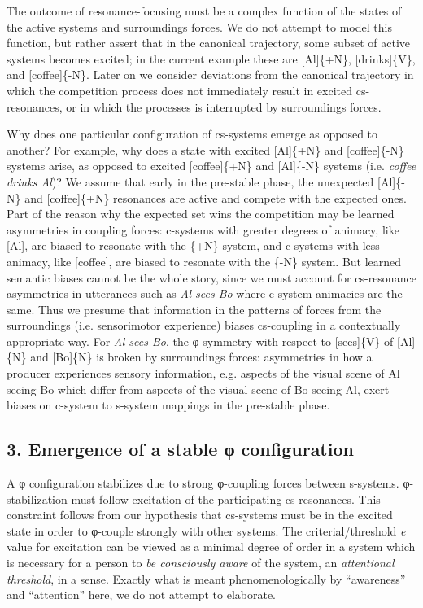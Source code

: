   The outcome of resonance-focusing must be a complex function of the states of the active systems and surroundings forces. We do not attempt to model this function, but rather assert that in the canonical trajectory, some subset of active systems becomes excited; in the current example these are [Al]\{+N\}, [drinks]\{V\}, and [coffee]\{-N\}. Later on we consider deviations from the canonical trajectory in which the competition process does not immediately result in excited cs-resonances, or in which the processes is interrupted by surroundings forces.

  Why does one particular configuration of cs-systems emerge as opposed to another? For example, why does a state with excited [Al]\{+N\} and [coffee]\{-N\} systems arise, as opposed to excited [coffee]\{+N\} and [Al]\{-N\} systems (i.e. \textit{coffee drinks Al})? We assume that early in the pre-stable phase, the unexpected [Al]\{-N\} and [coffee]\{+N\} resonances are active and compete with the expected ones. Part of the reason why the expected set wins the competition may be learned asymmetries in coupling forces: c-systems with greater degrees of animacy, like [Al], are biased to resonate with the \{+N\} system, and c-systems with less animacy, like [coffee], are biased to resonate with the \{-N\} system. But learned semantic biases cannot be the whole story, since we must account for cs-resonance asymmetries in utterances such as \textit{Al sees Bo} where c-system animacies are the same. Thus we presume that information in the patterns of forces from the surroundings (i.e. sensorimotor experience) biases cs-coupling in a contextually appropriate way. For \textit{Al sees Bo}, the φ symmetry with respect to [sees]\{V\} of [Al]\{N\} and [Bo]\{N\} is broken by surroundings forces: asymmetries in how a producer experiences sensory information, e.g. aspects of the visual scene of Al seeing Bo which differ from aspects of the visual scene of Bo seeing Al, exert biases on c-system to s-system mappings in the pre-stable phase.

\subsection{3. Emergence of a stable φ configuration}

A φ configuration stabilizes due to strong φ{}-coupling forces between s-systems. φ{}-stabilization must follow excitation of the participating cs-resonances. This constraint follows from our hypothesis that cs-systems must be in the excited state in order to φ-couple strongly with other systems. The criterial/threshold \textit{e} value for excitation can be viewed as a minimal degree of order in a system which is necessary for a person to \textit{be consciously aware} of the system, an \textit{attentional threshold}, in a sense. Exactly what is meant phenomenologically by “awareness” and “attention” here, we do not attempt to elaborate. 

